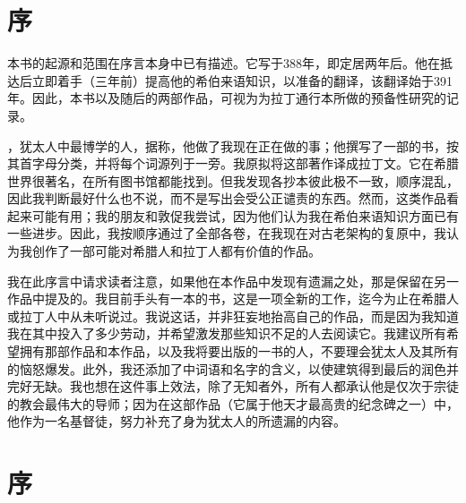 
\section{序}

本书的起源和范围在序言本身中已有描述。它写于388年，即定居两年后。他在抵达后立即着手（三年前）提高他的希伯来语知识，以准备的翻译，该翻译始于391年。因此，本书以及随后的两部作品，可视为为拉丁通行本所做的预备性研究的记录。\par

，犹太人中最博学的人，据称，他做了我现在正在做的事；他撰写了一部的书，按其首字母分类，并将每个词源列于一旁。我原拟将这部著作译成拉丁文。它在希腊世界很著名，在所有图书馆都能找到。但我发现各抄本彼此极不一致，顺序混乱，因此我判断最好什么也不说，而不是写出会受公正谴责的东西。然而，这类作品看起来可能有用；我的朋友和敦促我尝试，因为他们认为我在希伯来语知识方面已有一些进步。因此，我按顺序通过了全部各卷，在我现在对古老架构的复原中，我认为我创作了一部可能对希腊人和拉丁人都有价值的作品。\par

我在此序言中请求读者注意，如果他在本作品中发现有遗漏之处，那是保留在另一作品中提及的。我目前手头有一本的书，这是一项全新的工作，迄今为止在希腊人或拉丁人中从未听说过。我说这话，并非狂妄地抬高自己的作品，而是因为我知道我在其中投入了多少劳动，并希望激发那些知识不足的人去阅读它。我建议所有希望拥有那部作品和本作品，以及我将要出版的一书的人，不要理会犹太人及其所有的恼怒爆发。此外，我还添加了中词语和名字的含义，以使建筑得到最后的润色并完好无缺。我也想在这件事上效法，除了无知者外，所有人都承认他是仅次于宗徒的教会最伟大的导师；因为在这部作品（它属于他天才最高贵的纪念碑之一）中，他作为一名基督徒，努力补充了身为犹太人的所遗漏的内容。\par


\section{序}

\par

